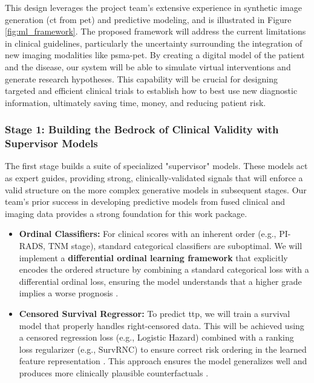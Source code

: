 \documentclass[11pt, a4paper]{article}
\begin{document}
This design leverages the project team's extensive experience in synthetic image generation (\gls{ct} from \gls{pet}) and predictive modeling, and is illustrated in Figure \ref{fig:ml_framework}. The proposed framework will address the current limitations in clinical guidelines, particularly the uncertainty surrounding the integration of new imaging modalities like \gls{psma}-\gls{pet}. By creating a digital model of the patient and the disease, our system will be able to simulate virtual interventions and generate research hypotheses. This capability will be crucial for designing targeted and efficient clinical trials to establish how to best use new diagnostic information, ultimately saving time, money, and reducing patient risk.

\subsubsection{Stage 1: Building the Bedrock of Clinical Validity with Supervisor Models}
The first stage builds a suite of specialized "supervisor" models. These models act as expert guides, providing strong, clinically-validated signals that will enforce a valid structure on the more complex generative models in subsequent stages. Our team's prior success in developing predictive models from fused clinical and imaging data provides a strong foundation for this work package.
\begin{itemize}
    \item \textbf{Ordinal Classifiers:} For clinical scores with an inherent order (e.g., PI-RADS, TNM stage), standard categorical classifiers are suboptimal. We will implement a \textbf{differential ordinal learning framework} that explicitly encodes the ordered structure by combining a standard categorical loss with a differential ordinal loss, ensuring the model understands that a higher grade implies a worse prognosis \cite{LeeByeon2025, GrisiKartasalo2025}.
    \item \textbf{Censored Survival Regressor:} To predict \gls{ttp}, we will train a survival model that properly handles right-censored data. This will be achieved using a censored regression loss (e.g., Logistic Hazard) combined with a ranking loss regularizer (e.g., SurvRNC) to ensure correct risk ordering in the learned feature representation \cite{GaoLi2019, RivailVogl2023, SaeedRidzuan2024}.
This approach ensures the model generalizes well and produces more clinically plausible counterfactuals \cite{PuglisiAlexander2025, ZhangHager2025}.
\end{itemize}
\end{document}
